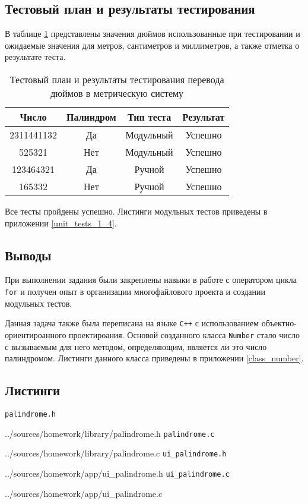 \documentclass[12pt,a4paper]{report}
\begin{document}
\subsection{Тестовый план и результаты тестирования}
\hspace{\parindent}В таблице \ref{inch_to_cm_test_plan} представлены значения дюймов использованные при тестировании и ожидаемые значения для метров, сантиметров и миллиметров, а также отметка о результате теста.
\FloatBarrier
\begin{table}[h]
\caption{Тестовый план и результаты тестирования перевода дюймов в метрическую систему}
\label{inch_to_cm_test_plan}
\begin{tabular}{| c | c | c | c |}
\hline 
Число & Палиндром & Тип теста & Результат\\ 
\hline 
2311441132 & Да & Модульный & Успешно \\ 
\hline 
525321 & Нет & Модульный & Успешно \\ 
\hline 
123464321 & Да & Ручной & Успешно \\ 
\hline 
165332 & Нет & Ручной & Успешно \\ 
\hline 
\end{tabular} 
\end{table}
\FloatBarrier
Все тесты пройдены успешно. Листинги модульных тестов приведены в приложении \ref{unit_tests_1_4}.
\subsection{Выводы}
\hspace{\parindent}При выполнении задания были закреплены навыки в работе с оператором цикла \verb+for+ и получен опыт в организации многофайлового проекта и создании модульных тестов.

Данная задача также была переписана на языке \verb|C++| с использованием объектно-ориентироанного проектироания. Основой созданного класса \verb+Number+ стало число с вызываемым для него методом, определяющим, является ли это число палиндромом. Листинги данного класса приведены в приложении \ref{class_number}.

\newpage
\subsection{Листинги}
\verb+palindrome.h+

{../sources/homework/library/palindrome.h}
\verb+palindrome.c+

{../sources/homework/library/palindrome.c}
\verb+ui_palindrome.h+

{../sources/homework/app/ui_palindrome.h}
\verb+ui_palindrome.c+

{../sources/homework/app/ui_palindrome.c}
\end{document}
